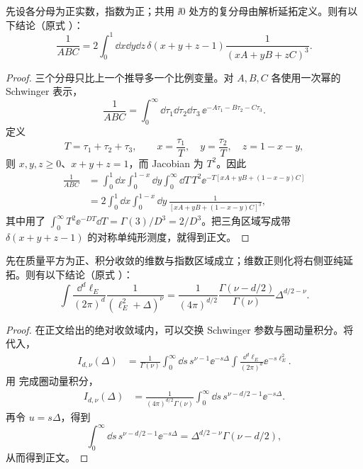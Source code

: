 \begin{proposition}[三个分母的单纯形参数公式]
先设各分母为正实数，指数为正；共用 $\ii0$ 处方的复分母由解析延拓定义。则有以下结论（原式 ）：
\begin{equation*}
 \boxed{
 \frac1{ABC}
 =2\int_0^1\dd x\dd y\dd z\,
 \delta(x+y+z-1)
 \frac1{(xA+yB+zC)^3}.}
\end{equation*}
\end{proposition}
\begin{proof}
三个分母只比上一个推导多一个比例变量。对 $A,B,C$ 各使用一次幂的 Schwinger 表示，
\begin{equation*}
 \frac1{ABC}
 =\int_0^\infty\dd\tau_1\dd\tau_2\dd\tau_3\,
 \ee^{-A\tau_1-B\tau_2-C\tau_3}.
\end{equation*}
定义
\begin{equation*}
 T=\tau_1+\tau_2+\tau_3,
 \qquad x=\frac{\tau_1}{T},
 \quad y=\frac{\tau_2}{T},
 \quad z=1-x-y,
\end{equation*}
则 $x,y,z\ge0$、$x+y+z=1$，而 Jacobian 为 $T^2$。因此
\begin{align*}
 \frac1{ABC}
 &=\int_0^1\dd x\int_0^{1-x}\dd y
 \int_0^\infty\dd T\,T^2
 \ee^{-T[xA+yB+(1-x-y)C]}\\
 &=2\int_0^1\dd x\int_0^{1-x}\dd y\,
 \frac1{[xA+yB+(1-x-y)C]^3},
\end{align*}
其中用了 $\int_0^\infty T^2\ee^{-DT}\dd T=\Gamma(3)/D^3=2/D^3$。把三角区域写成带 $\delta(x+y+z-1)$ 的对称单纯形测度，就得到正文。
\end{proof}


\begin{proposition}
先在质量平方为正、积分收敛的维数与指数区域成立；维数正则化将右侧亚纯延拓。则有以下结论（原式 ）：
\begin{equation*}
\boxed{
\int\frac{\dd^d \ell_E}{(2\pi)^d}
\frac1{(\ell_E^2+\Delta)^\nu}
=\frac1{(4\pi)^{d/2}}
\frac{\Gamma(\nu-d/2)}{\Gamma(\nu)}
\Delta^{d/2-\nu}.}
\end{equation*}
\end{proposition}
\begin{proof}
在正文给出的绝对收敛域内，可以交换 Schwinger 参数与圈动量积分。将 代入，
\begin{align*}
 I_{d,\nu}(\Delta)
 &=\frac1{\Gamma(\nu)}
 \int_0^\infty\dd s\,s^{\nu-1}\ee^{-s\Delta}
 \int\frac{\dd^d \ell_E}{(2\pi)^d}\ee^{-s\ell_E^2}.
\end{align*}
用 完成圈动量积分，
\begin{align*}
 I_{d,\nu}(\Delta)
 &=\frac1{(4\pi)^{d/2}\Gamma(\nu)}
 \int_0^\infty\dd s\,
 s^{\nu-d/2-1}\ee^{-s\Delta}.
\end{align*}
再令 $u=s\Delta$，得到
\begin{equation*}
 \int_0^\infty\dd s\,s^{\nu-d/2-1}\ee^{-s\Delta}
 =\Delta^{d/2-\nu}\Gamma(\nu-d/2),
\end{equation*}
从而得到正文。
\end{proof}


